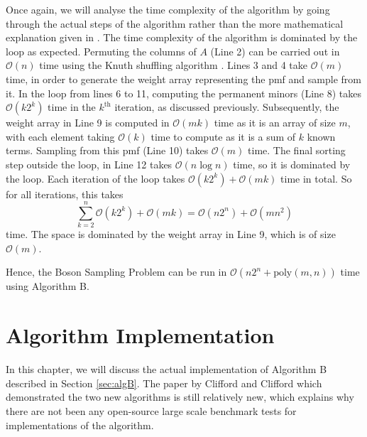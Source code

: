 \documentclass[ %
                    author={Manan Vaswani},
                supervisor={Dr. Raphael Clifford},
                    degree={MEng},
                     title={A multi-core CPU implementation of the classical Boson Sampling algorithm},
                  subtitle={},
                      type={},
                      year={2019} ]{dissertation}
\theoremstyle{plain}
\theoremstyle{definition}
\begin{document}
Once again, we will analyse the time complexity of the algorithm by going through the actual steps of the algorithm rather than the more mathematical explanation given in \cite{clifford17}. The time complexity of the algorithm is dominated by the loop as expected. Permuting the columns of $A$ (Line 2) can be carried out in $\mathcal{O}(n)$ time using the Knuth shuffling algorithm \cite{knuth1969}. Lines 3 and 4 take $\mathcal{O}(m)$ time, in order to generate the weight array representing the pmf and sample from it. In the loop from lines 6 to 11, computing the permanent minors (Line 8) takes $\mathcal{O}(k 2^k)$ time in the $k^{\text{th}}$ iteration, as discussed previously. Subsequently, the weight array in Line 9 is computed in $\mathcal{O}(mk)$ time as it is an array of size $m$, with each element taking $\mathcal{O}(k)$ time to compute as it is a sum of $k$ known terms. Sampling from this pmf (Line 10) takes $\mathcal{O}(m)$ time. The final sorting step outside the loop, in Line 12 takes $\mathcal{O}(n \log n)$ time, so it is dominated by the loop. Each iteration of the loop takes $\mathcal{O}(k 2^k) + \mathcal{O}(mk)$ time in total. So for all iterations, this takes
\begin{equation}
\sum_{k=2}^n \mathcal{O}(k2^k) + \mathcal{O}(mk) = \mathcal{O}(n2^n) + \mathcal{O}(mn^2)
\end{equation}
time. The space is dominated by the weight array in Line 9, which is of size $\mathcal{O}(m)$.

Hence, the Boson Sampling Problem can be run in $\mathcal{O}(n2^n + \text{poly}(m, n))$ time using Algorithm B.


\chapter{Algorithm Implementation}
\label{chap:execution}

In this chapter, we will discuss the actual implementation of Algorithm B described in Section \ref{sec:algB}. The paper by Clifford and Clifford which demonstrated the two new algorithms is still relatively new, which explains why there are not been any open-source large scale benchmark tests for implementations of the algorithm.
\end{document}

